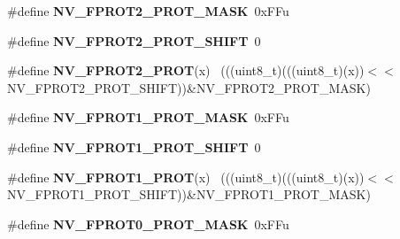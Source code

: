 \begin{DoxyCompactItemize}
\item 
\hypertarget{group___n_v___register___masks_ga99b7ccf89e4d3cc80d0317086202de0f}{}\#define {\bfseries N\+V\+\_\+\+F\+P\+R\+O\+T2\+\_\+\+P\+R\+O\+T\+\_\+\+M\+A\+S\+K}~0x\+F\+Fu\label{group___n_v___register___masks_ga99b7ccf89e4d3cc80d0317086202de0f}

\item 
\hypertarget{group___n_v___register___masks_ga50f9336b86839704ca20297b040c3ca5}{}\#define {\bfseries N\+V\+\_\+\+F\+P\+R\+O\+T2\+\_\+\+P\+R\+O\+T\+\_\+\+S\+H\+I\+F\+T}~0\label{group___n_v___register___masks_ga50f9336b86839704ca20297b040c3ca5}

\item 
\hypertarget{group___n_v___register___masks_ga0a02b2f351b6b36febb00f4ac3604a9c}{}\#define {\bfseries N\+V\+\_\+\+F\+P\+R\+O\+T2\+\_\+\+P\+R\+O\+T}(x)                                            ~(((uint8\+\_\+t)(((uint8\+\_\+t)(x))$<$$<$N\+V\+\_\+\+F\+P\+R\+O\+T2\+\_\+\+P\+R\+O\+T\+\_\+\+S\+H\+I\+F\+T))\&N\+V\+\_\+\+F\+P\+R\+O\+T2\+\_\+\+P\+R\+O\+T\+\_\+\+M\+A\+S\+K)\label{group___n_v___register___masks_ga0a02b2f351b6b36febb00f4ac3604a9c}

\item 
\hypertarget{group___n_v___register___masks_ga4ca39bad3b57769cb423f1616c985e38}{}\#define {\bfseries N\+V\+\_\+\+F\+P\+R\+O\+T1\+\_\+\+P\+R\+O\+T\+\_\+\+M\+A\+S\+K}~0x\+F\+Fu\label{group___n_v___register___masks_ga4ca39bad3b57769cb423f1616c985e38}

\item 
\hypertarget{group___n_v___register___masks_ga06d0cb2797f243b77d60cfecedfc9f86}{}\#define {\bfseries N\+V\+\_\+\+F\+P\+R\+O\+T1\+\_\+\+P\+R\+O\+T\+\_\+\+S\+H\+I\+F\+T}~0\label{group___n_v___register___masks_ga06d0cb2797f243b77d60cfecedfc9f86}

\item 
\hypertarget{group___n_v___register___masks_gaf206463f78b039135d71cfd13dc43193}{}\#define {\bfseries N\+V\+\_\+\+F\+P\+R\+O\+T1\+\_\+\+P\+R\+O\+T}(x)                                            ~(((uint8\+\_\+t)(((uint8\+\_\+t)(x))$<$$<$N\+V\+\_\+\+F\+P\+R\+O\+T1\+\_\+\+P\+R\+O\+T\+\_\+\+S\+H\+I\+F\+T))\&N\+V\+\_\+\+F\+P\+R\+O\+T1\+\_\+\+P\+R\+O\+T\+\_\+\+M\+A\+S\+K)\label{group___n_v___register___masks_gaf206463f78b039135d71cfd13dc43193}

\item 
\hypertarget{group___n_v___register___masks_gafb9244a297e4e856c53e7cb9515d8549}{}\#define {\bfseries N\+V\+\_\+\+F\+P\+R\+O\+T0\+\_\+\+P\+R\+O\+T\+\_\+\+M\+A\+S\+K}~0x\+F\+Fu\label{group___n_v___register___masks_gafb9244a297e4e856c53e7cb9515d8549}


\end{DoxyCompactItemize}
